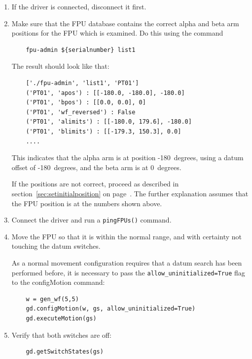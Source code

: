\documentclass[11pt,a4paper]{scrartcl}
\begin{document}
\begin{enumerate}
\item If the driver is connected, disconnect it first.
  
\item Make sure that the FPU database contains the correct alpha and
  beta arm positions for the FPU which is examined. Do this using
  the command
  \begin{verbatim}
    fpu-admin ${serialnumber} list1
  \end{verbatim}

  The result should look like that:

  \begin{verbatim}
    ['./fpu-admin', 'list1', 'PT01']
    ('PT01', 'apos') : [[-180.0, -180.0], -180.0]
    ('PT01', 'bpos') : [[0.0, 0.0], 0]
    ('PT01', 'wf_reversed') : False
    ('PT01', 'alimits') : [[-180.0, 179.6], -180.0]
    ('PT01', 'blimits') : [[-179.3, 150.3], 0.0]
    ....
  \end{verbatim}

  This indicates that the alpha arm is at position -180\degree\ degrees,
  using a datum offset of -180\degree\ degrees, and the beta arm is at
  0\degree\ degrees.
  
  If the positions are not correct, proceed as described in
  section~\ref{sec:setinitialposition} on
  page~\pageref{sec:setinitialposition}. The further explanation
  assumes that the FPU position is at the numbers shown above.

\item Connect the driver and run a \texttt{pingFPUs()} command.
  
\item Move the FPU so that it is within the normal range, and with
  certainty not touching the datum switches.
  
  As a normal movement configuration requires
  that a datum search has been performed before,
  it is necessary to pass the \texttt{allow\_uninitialized=True}
  flag to the configMotion command:
  
  \begin{verbatim}
    w = gen_wf(5,5)
    gd.configMotion(w, gs, allow_uninitialized=True)
    gd.executeMotion(gs)
  \end{verbatim}
  
\item Verify that both switches are off:
    
  \begin{verbatim}
    gd.getSwitchStates(gs)
  \end{verbatim}
  

\end{enumerate}
\end{document}

